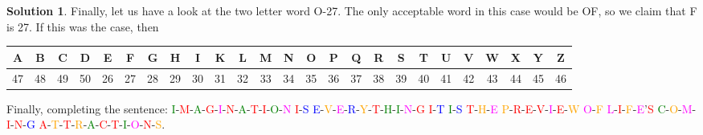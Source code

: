 \documentclass[11pt]{article}
\theoremstyle{definition}\newtheorem{definition}{Definition}
\theoremstyle{definition}\newtheorem{question}{Question}
\theoremstyle{definition}\newtheorem*{solution}{Solution}
\begin{document}
\begin{solution}
    Finally, let us have a look at the two letter word O-27. The only acceptable word in this case would be OF, so we claim that F is 27. If this was the case, then
    \begin{center}\tiny\hspace*{-20pt}
        \begin{tabular}{ccccccccccccccccccccccccc} \hline
            A & B & C & D & E & F & G & H & I & K & L & M & N & O & P & Q & R & S & T & U & V & W & X & Y & Z \\ \hline
            47 & 48 & 49 & 50 & 26 & 27 & 28 & 29 & 30 & 31 & 32 & 33 & 34 & 35 & 36 & 37 & 38 & 39 & 40 & 41 & 42 & 43 & 44 & 45 & 46 \\ \hline
        \end{tabular}
    \end{center}
    Finally, completing the sentence: \textcolor{green}{I}-\textcolor{red}{M}-\textcolor{green}{A}-\textcolor{red}{G}-\textcolor{magenta}{I}-\textcolor{red}{N}-\textcolor{green}{A}-\textcolor{red}{T}-\textcolor{red}{I}-\textcolor{green}{O}-\textcolor{magenta}{N} \textcolor{red}{I}-\textcolor{blue}{S} \textcolor{blue}{E}-\textcolor{orange}{V}-\textcolor{magenta}{E}-\textcolor{blue}{R}-\textcolor{orange}{Y}-\textcolor{red}{T}-\textcolor{green}{H}-\textcolor{green}{I}-\textcolor{magenta}{N}-\textcolor{red}{G} \textcolor{red}{I}-\textcolor{blue}{T} \textcolor{green}{I}-\textcolor{blue}{S} \textcolor{red}{T}-\textcolor{orange}{H}-\textcolor{magenta}{E} \textcolor{orange}{P}-\textcolor{red}{R}-\textcolor{red}{E}-\textcolor{red}{V}-\textcolor{magenta}{I}-\textcolor{red}{E}-\textcolor{orange}{W} \textcolor{magenta}{O}-\textcolor{orange}{F} \textcolor{magenta}{L}-\textcolor{red}{I}-\textcolor{orange}{F}-\textcolor{magenta}{E}'\textcolor{red}{S} \textcolor{green}{C}-\textcolor{orange}{O}-\textcolor{magenta}{M}-\textcolor{red}{I}-\textcolor{red}{N}-\textcolor{blue}{G} \textcolor{red}{A}-\textcolor{orange}{T}-\textcolor{red}{T}-\textcolor{orange}{R}-\textcolor{green}{A}-\textcolor{red}{C}-\textcolor{red}{T}-\textcolor{green}{I}-\textcolor{magenta}{O}-\textcolor{red}{N}-\textcolor{orange}{S}.


\end{solution}
\end{document}
